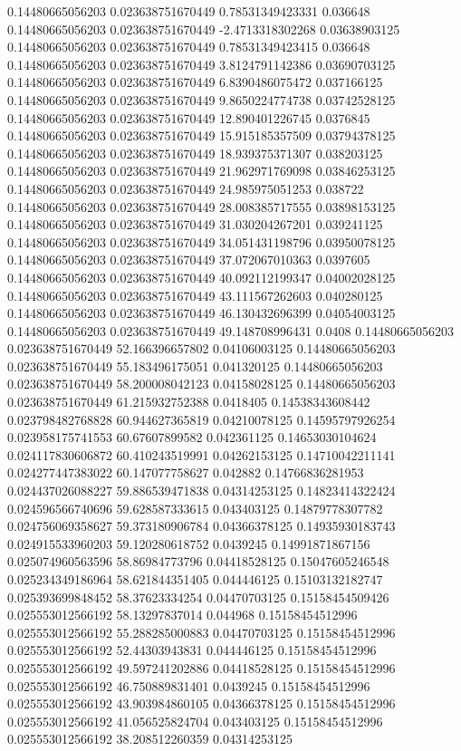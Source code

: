 0.14480665056203 0.023638751670449 0.78531349423331 0.036648
0.14480665056203 0.023638751670449 -2.4713318302268 0.03638903125
0.14480665056203 0.023638751670449 0.78531349423415 0.036648
0.14480665056203 0.023638751670449 3.8124791142386 0.03690703125
0.14480665056203 0.023638751670449 6.8390486075472 0.037166125
0.14480665056203 0.023638751670449 9.8650224774738 0.03742528125
0.14480665056203 0.023638751670449 12.890401226745 0.0376845
0.14480665056203 0.023638751670449 15.915185357509 0.03794378125
0.14480665056203 0.023638751670449 18.939375371307 0.038203125
0.14480665056203 0.023638751670449 21.962971769098 0.03846253125
0.14480665056203 0.023638751670449 24.985975051253 0.038722
0.14480665056203 0.023638751670449 28.008385717555 0.03898153125
0.14480665056203 0.023638751670449 31.030204267201 0.039241125
0.14480665056203 0.023638751670449 34.051431198796 0.03950078125
0.14480665056203 0.023638751670449 37.072067010363 0.0397605
0.14480665056203 0.023638751670449 40.092112199347 0.04002028125
0.14480665056203 0.023638751670449 43.111567262603 0.040280125
0.14480665056203 0.023638751670449 46.130432696399 0.04054003125
0.14480665056203 0.023638751670449 49.148708996431 0.0408
0.14480665056203 0.023638751670449 52.166396657802 0.04106003125
0.14480665056203 0.023638751670449 55.183496175051 0.041320125
0.14480665056203 0.023638751670449 58.200008042123 0.04158028125
0.14480665056203 0.023638751670449 61.215932752388 0.0418405
0.14538343608442 0.023798482768828 60.944627365819 0.04210078125
0.14595797926254 0.023958175741553 60.67607899582 0.042361125
0.14653030104624 0.024117830606872 60.410243519991 0.04262153125
0.14710042211141 0.024277447383022 60.147077758627 0.042882
0.14766836281953 0.024437026088227 59.886539471838 0.04314253125
0.14823414322424 0.024596566740696 59.628587333615 0.043403125
0.14879778307782 0.024756069358627 59.373180906784 0.04366378125
0.14935930183743 0.024915533960203 59.120280618752 0.0439245
0.14991871867156 0.025074960563596 58.86984773796 0.04418528125
0.15047605246548 0.025234349186964 58.621844351405 0.044446125
0.15103132182747 0.025393699848452 58.37623334254 0.04470703125
0.15158454509426 0.025553012566192 58.13297837014 0.044968
0.15158454512996 0.025553012566192 55.288285000883 0.04470703125
0.15158454512996 0.025553012566192 52.44303943831 0.044446125
0.15158454512996 0.025553012566192 49.597241202886 0.04418528125
0.15158454512996 0.025553012566192 46.750889831401 0.0439245
0.15158454512996 0.025553012566192 43.903984860105 0.04366378125
0.15158454512996 0.025553012566192 41.056525824704 0.043403125
0.15158454512996 0.025553012566192 38.208512260359 0.04314253125
